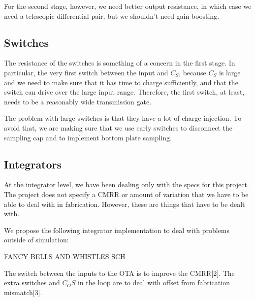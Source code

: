\documentclass[conference]{IEEEtran}
\begin{document}
For the second stage, however, we need better output resistance, in which case we need a telescopic differential pair, but we shouldn't need gain boosting.

\subsection{Switches}
The resistance of the switches is something of a concern in the first stage. In particular, the very first switch between the input and $C_S$, because $C_S$ is large and we need to make sure that it has time to charge sufficiently, and that the switch can drive over the large input range. Therefore, the first switch, at least, needs to be a reasonably wide transmission gate.

The problem with large switches is that they have a lot of charge injection. To avoid that, we are making sure that we use early switches to disconnect the sampling cap and to implement bottom plate sampling.

\subsection{Integrators}
At the integrator level, we have been dealing only with the specs for this project. The project does not specify a CMRR or amount of variation that we have to be able to deal with in fabrication. However, these are things that have to be dealt with.

We propose the following integrator implementation to deal with problems outside of simulation:

FANCY BELLS AND WHISTLES SCH

The switch between the inputs to the OTA is to improve the CMRR[2]. The extra switches and $C_OS$ in the loop are to deal with offset from fabrication mismatch[3]. 





\end{document}
